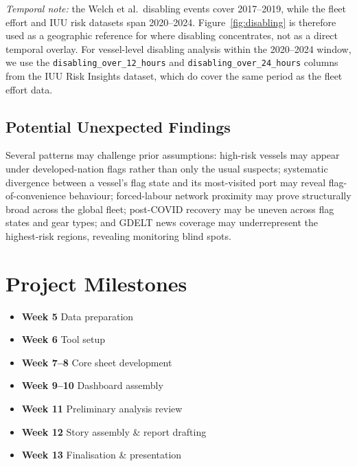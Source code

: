 \documentclass[sigconf]{acmart}
\begin{document}
\textit{Temporal note:} the Welch et al.\ disabling events cover 2017--2019, while the fleet effort and IUU risk datasets span 2020--2024. Figure~\ref{fig:disabling} is therefore used as a geographic reference for where disabling concentrates, not as a direct temporal overlay. For vessel-level disabling analysis within the 2020--2024 window, we use the \texttt{disabling\_over\_12\_hours} and \texttt{disabling\_over\_24\_hours} columns from the IUU Risk Insights dataset, which do cover the same period as the fleet effort data.

\subsection{Potential Unexpected Findings}
Several patterns may challenge prior assumptions: high-risk vessels may appear under developed-nation flags rather than only the usual suspects; systematic divergence between a vessel's flag state and its most-visited port may reveal flag-of-convenience behaviour; forced-labour network proximity may prove structurally broad across the global fleet; post-COVID recovery may be uneven across flag states and gear types; and GDELT news coverage may underrepresent the highest-risk regions, revealing monitoring blind spots.

\section{Project Milestones}
\begin{itemize}
    \item \textbf{Week 5} Data preparation
    \item \textbf{Week 6} Tool setup
    \item \textbf{Week 7--8} Core sheet development
    \item \textbf{Week 9--10} Dashboard assembly
    \item \textbf{Week 11} Preliminary analysis review
    \item \textbf{Week 12} Story assembly \& report drafting
    \item \textbf{Week 13} Finalisation \& presentation
\end{itemize}

\newpage


\end{document}
